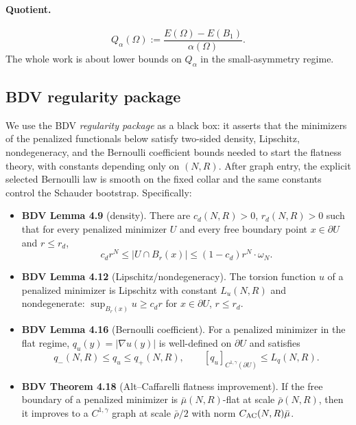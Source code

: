 \documentclass[11pt]{amsart}
\theoremstyle{definition}
\newcommand{\abs}[1]{\left|#1\right|}
\begin{document}
\paragraph{Quotient.}
\[
Q_\alpha(\Omega):=\frac{E(\Omega)-E(B_1)}{\alpha(\Omega)}.
\]
The whole work is about lower bounds on $Q_\alpha$ in the small-asymmetry regime.

\subsection{BDV regularity package}

We use the BDV \emph{regularity package} as a black box: it asserts that the
minimizers of the penalized functionals below satisfy two-sided density,
Lipschitz, nondegeneracy, and the Bernoulli coefficient bounds needed to start
the flatness theory, with constants depending only on $(N,R)$. After graph
entry, the explicit selected Bernoulli law is smooth on the fixed collar and
the same constants control the Schauder bootstrap. Specifically:

\begin{itemize}
\item \textbf{BDV Lemma 4.9} (density). There are
$c_d(N,R)>0$, $r_d(N,R)>0$ such that for every penalized minimizer $U$ and
every free boundary point $x\in\partial U$ and $r\le r_d$,
\[
c_d r^N\le\abs{U\cap B_r(x)}\le(1-c_d)r^N\cdot\omega_N.
\]

\item \textbf{BDV Lemma 4.12} (Lipschitz/nondegeneracy). The torsion
function $u$ of a penalized minimizer is Lipschitz with constant $L_u(N,R)$
and nondegenerate: $\sup_{B_r(x)}u\ge c_d r$ for $x\in\partial U$, $r\le r_d$.

\item \textbf{BDV Lemma 4.16} (Bernoulli coefficient). For a penalized
minimizer in the flat regime, $q_u(y)=\abs{\nabla u(y)}$ is well-defined on
$\partial U$ and satisfies
\[
q_-(N,R)\le q_u\le q_+(N,R),\qquad[q_u]_{C^{1,\gamma}(\partial U)}\le L_q(N,R).
\]

\item \textbf{BDV Theorem 4.18} (Alt--Caffarelli flatness improvement). If
the free boundary of a penalized minimizer is $\bar\mu(N,R)$-flat at scale
$\bar\rho(N,R)$, then it improves to a $C^{1,\gamma}$ graph at scale
$\bar\rho/2$ with norm $C_{\rm AC}(N,R)\bar\mu$.
\end{itemize}
\end{document}
